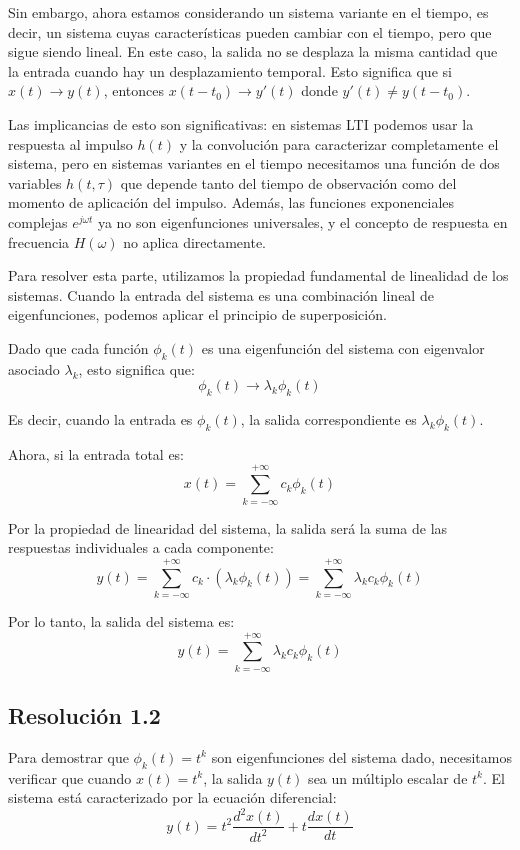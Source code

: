 \documentclass[
  11pt,
  letterpaper,
   addpoints,
   answers
  ]{exam}
\begin{document}
\begin{questions}
\begin{solution}
Sin embargo, ahora estamos considerando un sistema variante en el tiempo, es decir, un sistema cuyas características pueden cambiar con el tiempo, pero que sigue siendo lineal. En este caso, la salida no se desplaza la misma cantidad que la entrada cuando hay un desplazamiento temporal. Esto significa que si $x(t) \to y(t)$, entonces $x(t-t_0) \to y'(t)$ donde $y'(t) \neq y(t-t_0)$. 

Las implicancias de esto son significativas: en sistemas LTI podemos usar la respuesta al impulso $h(t)$ y la convolución para caracterizar completamente el sistema, pero en sistemas variantes en el tiempo necesitamos una función de dos variables $h(t,\tau)$ que depende tanto del tiempo de observación como del momento de aplicación del impulso. Además, las funciones exponenciales complejas $e^{j\omega t}$ ya no son eigenfunciones universales, y el concepto de respuesta en frecuencia $H(\omega)$ no aplica directamente.

Para resolver esta parte, utilizamos la propiedad fundamental de linealidad de los sistemas. Cuando la entrada del sistema es una combinación lineal de eigenfunciones, podemos aplicar el principio de superposición.

Dado que cada función $\phi_k(t)$ es una eigenfunción del sistema con eigenvalor asociado $\lambda_k$, esto significa que:
$$\phi_k(t) \to \lambda_k \phi_k(t)$$

Es decir, cuando la entrada es $\phi_k(t)$, la salida correspondiente es $\lambda_k \phi_k(t)$.

Ahora, si la entrada total es:
$$x(t) = \sum_{k=-\infty}^{+\infty} c_k\phi_k(t)$$

Por la propiedad de linearidad del sistema, la salida será la suma de las respuestas individuales a cada componente:
$$y(t) = \sum_{k=-\infty}^{+\infty} c_k \cdot (\lambda_k \phi_k(t)) = \sum_{k=-\infty}^{+\infty} \lambda_k c_k \phi_k(t)$$

Por lo tanto, la salida del sistema es:
$$\boxed{y(t) = \sum_{k=-\infty}^{+\infty} \lambda_k c_k \phi_k(t)}$$

\subsection*{Resolución 1.2}
Para demostrar que $\phi_k(t) = t^k$ son eigenfunciones del sistema dado, necesitamos verificar que cuando $x(t) = t^k$, la salida $y(t)$ sea un múltiplo escalar de $t^k$. El sistema está caracterizado por la ecuación diferencial:
$$y(t) = t^2 \frac{d^2x(t)}{dt^2} + t \frac{dx(t)}{dt}$$


\end{solution}
\end{questions}
\end{document}
